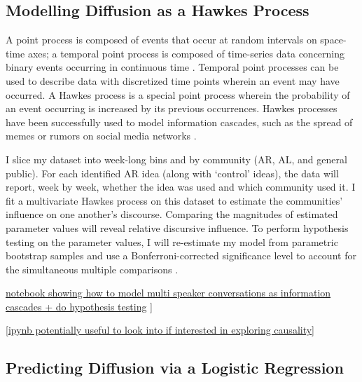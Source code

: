 \documentclass[acmlarge, screen, authorversion]{acmart}
\begin{document}
\subsection{Modelling Diffusion as a Hawkes Process}

A point process is composed of events that occur at random intervals on
space-time axes; a temporal point process is composed of time-series data
concerning binary events occurring in continuous time
\cite{daleyIntroductionTheoryPoint2003, ogataSpaceTimePointProcessModels1998}.
Temporal point processes can be used to describe data with discretized time
points wherein an event may have occurred. A Hawkes process is a special point
process wherein the probability of an event occurring is increased by its
previous occurrences. Hawkes processes have been successfully used to model
information cascades, such as the spread of memes or rumors on social media
networks
\cite{luoMultiTaskMultiDimensionalHawkes2015,lukasikHawkesProcessesContinuous2016}.

I slice my dataset into week-long bins and by community (AR, AL, and general
public). For each identified AR idea (along with  `control' ideas), the data
will report, week by week, whether the idea was used and which community used
it. I fit a multivariate Hawkes process on this dataset to estimate the
communities' influence on one another's discourse. Comparing the magnitudes of
estimated parameter values will reveal relative discursive influence. To perform
hypothesis testing on the parameter values, I will re-estimate my model from
parametric bootstrap samples \cite{reinhartReviewSelfExcitingSpatioTemporal2018}
and use a Bonferroni-corrected significance level to account for the
simultaneous multiple comparisons \cite{tanEffectWordingMessage2014}.

\href{https://github.com/jacobeisenstein/language-change-tutorial/blob/master/ic2s2-notebooks/FollowTheLeader.ipynb}{notebook
showing how to model multi speaker conversations as information cascades + do
hypothesis testing} ]

%
[\href{https://github.com/jacobeisenstein/language-change-tutorial/blob/master/ic2s2-notebooks/DontFeedTheTrolls.ipynb}{ipynb
potentially useful to look into if interested in exploring causality}]


\subsection{Predicting Diffusion via a Logistic Regression}
\end{document}

